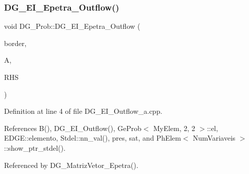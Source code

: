 \subsubsection{\texorpdfstring{D\+G\+\_\+\+E\+I\+\_\+\+Epetra\+\_\+\+Outflow()}{DG\_EI\_Epetra\_Outflow()}}
{\footnotesize\ttfamily void D\+G\+\_\+\+Prob\+::\+D\+G\+\_\+\+E\+I\+\_\+\+Epetra\+\_\+\+Outflow (\begin{DoxyParamCaption}\item[{const \hyperlink{structEDGE}{E\+D\+GE}}]{border,  }\item[{Teuchos\+::\+R\+CP$<$ Epetra\+\_\+\+F\+E\+Crs\+Matrix $>$}]{A,  }\item[{Teuchos\+::\+R\+CP$<$ Epetra\+\_\+\+F\+E\+Vector $>$}]{R\+HS }\end{DoxyParamCaption})}



Definition at line 4 of file D\+G\+\_\+\+E\+I\+\_\+\+Outflow\+\_\+a.\+cpp.



References B(), D\+G\+\_\+\+E\+I\+\_\+\+Outflow(), Ge\+Prob$<$ My\+Elem, 2, 2 $>$\+::el, E\+D\+G\+E\+::elemento, Stdel\+::nn\+\_\+val(), pres, sat, and Ph\+Elem$<$ Num\+Variaveis $>$\+::show\+\_\+ptr\+\_\+stdel().



Referenced by D\+G\+\_\+\+Matriz\+Vetor\+\_\+\+Epetra().

